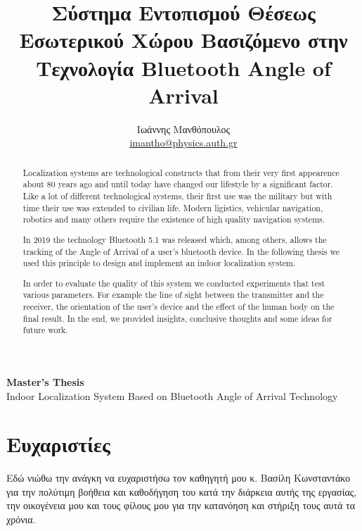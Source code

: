 \documentclass[a4paper,12pt]{report}
\def\te{\textlatin}
\def\tg{\textgreek}
\begin{document}
\begin{center}
    \textbf{Master's Thesis} \\
    Indoor Localization System Based on Bluetooth Angle of Arrival Technology
\end{center}
\begin{abstract}
Localization systems are technological constructs that from their very first appearence about 80 years ago and until today have changed our lifestyle
by a significant factor. Like a lot of different technological systems, their first use was the military but with time their use was extended to civilian life.
Modern ligistics, vehicular navigation, robotics and many others require the existence of high quality navigation systems.

In 2019 the technology Bluetooth 5.1 was released which, among others, allows the tracking of the Angle of Arrival of a user's bluetooth device.
In the following thesis we used this principle to design and implement an indoor localization system.

In order to evaluate the quality of this system we conducted experiments that test various parameters. For example the line of sight between the transmitter and
the receiver, the orientation of the user's device and the effect of the human body on the final result. In the end, we provided insights, conclusive
thoughts and some ideas for future work.
\end{abstract}

\section*{Ευχαριστίες}
Εδώ νιώθω την ανάγκη να ευχαριστήσω τον καθηγητή μου κ. Βασίλη Κωνσταντάκο για την πολύτιμη βοήθεια και καθοδήγηση του κατά την διάρκεια αυτής της εργασίας,
την οικογένεια μου και τους φίλους μου για την κατανόηση και στήριξη τους αυτά τα χρόνια.
\thispagestyle{empty}

\title{Σύστημα Εντοπισμού Θέσεως Εσωτερικού Χώρου Βασιζόμενο στην Τεχνολογία \te{Bluetooth Angle of Arrival}}
\author{Ιωάννης Μανθόπουλος \\
\href{mailto:imantho@physics.auth.gr}{\te{imantho@physics.auth.gr}}}
\maketitle

\tableofcontents
\thispagestyle{empty}

\renewcommand{\listfigurename}{\tg{Λίστα Σχημάτων}}
\renewcommand{\listtablename}{\tg{Λίστα Πινάκων}}
\renewcommand{\listalgorithmname}{\tg{Λίστα Αλγορίθμων}}

\listoftables
\listoffigures






\printbibliography[title=\tg{Βιβλιογραφία}]
\end{document}
